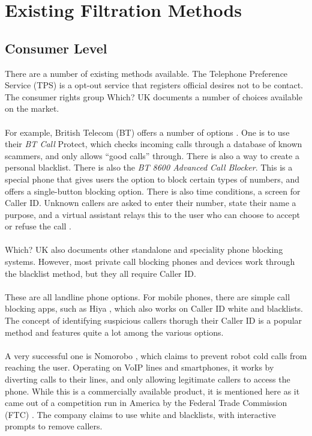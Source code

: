 \documentclass[main.tex]{subfiles}
\begin{document}
\section{Existing Filtration Methods}\label{sec:methods}
\subsection{Consumer Level}
There are a number of existing methods available. The Telephone Preference Service (TPS) \cite{tps} is a opt-out service that registers official desires not to be contact. The consumer rights group Which? UK \cite{which-methods} documents a number of choices available on the market.
\\\\
For example, British Telecom (BT) offers a number of options \cite{bt-block}. One is to use their \textit{BT Call} Protect, which checks incoming calls through a database of known scammers, and only allows ``good calls'' through. There is also a way to create a personal blacklist. There is also the \textit{BT 8600 Advanced Call Blocker}. This is a special phone that gives users the option to block certain types of numbers, and offers a single-button blocking option. There is also time conditions, a screen for Caller ID. Unknown callers are asked to enter their number, state their name a purpose, and a virtual assistant relays this to the user who can choose to accept or refuse the call \cite{bt-block}.
\\\\
Which? UK \cite{which-methods} also documents other standalone and speciality phone blocking systems. However, most private call blocking phones and devices work through the blacklist method, but they all require Caller ID.
\\\\
These are all landline phone options. For mobile phones, there are simple call blocking apps, such as Hiya \cite{macworld}, which also works on Caller ID white and blacklists. The concept of identifying suspicious callers thorugh their Caller ID is a popular method and features quite a lot among the various options.
\\\\
A very successful one is Nomorobo \cite{nomorobo}, which claims to prevent robot cold calls from reaching the user. Operating on VoIP lines and smartphones, it works by diverting calls to their lines, and only allowing legitimate callers to access the phone. While this is a commercially available product, it is mentioned here as it came out of a competition run in America by the Federal Trade Commission (FTC) \cite{wired-nomorobo}. The company claims to use white and blacklists, with interactive prompts to remove callers.
\end{document}
